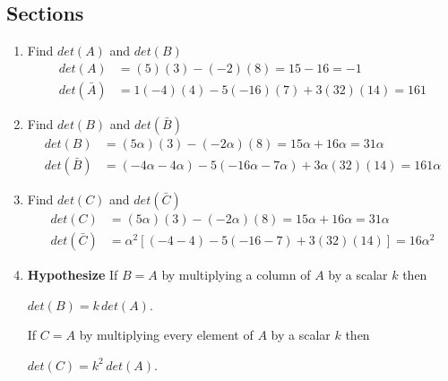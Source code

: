 \documentclass{article}
\begin{document}
    \subsection{Sections}
    \begin{enumerate}[label=(\alph*)]
      \item Find $det(A)$ and $det(B)$
            \begin{align*}
              det(A)&=(5)(3)-(-2)(8)=15-16=-1 \\
              det(\bar{A})&=1(-4)(4)-5(-16)(7)+3(32)(14)=161
            \end{align*}
      \item Find $det(B)$ and $det(\bar{B})$
            \begin{align*}
              det(B)&=(5\alpha)(3)-(-2\alpha)(8)=15\alpha+16\alpha=31\alpha \\
              det(\bar{B})&=(-4\alpha-4\alpha)-5(-16\alpha-7\alpha)+3\alpha(32)(14)=161\alpha
            \end{align*}
      \item Find $det(C)$ and $det(\bar{C})$
            \begin{align*}
              det(C)&=(5\alpha)(3)-(-2\alpha)(8)=15\alpha+16\alpha=31\alpha \\
              det(\bar{C})&=\alpha^{2}[(-4-4)-5(-16-7)+3(32)(14)]=16\alpha^{2}
            \end{align*}
      \item \textbf{Hypothesize}
            \newline\newline
            If $B=A$ by multiplying a column of $A$ by a scalar $k$ then 
            \begin{center}
              $det(B)=k\,det(A)$.
            \end{center}
            If $C=A$ by multiplying every element of $A$ by a scalar $k$ then
            \begin{center}
              $det(C)=k^2\,det(A)$.
            \end{center}

    \end{enumerate}
\end{document}
